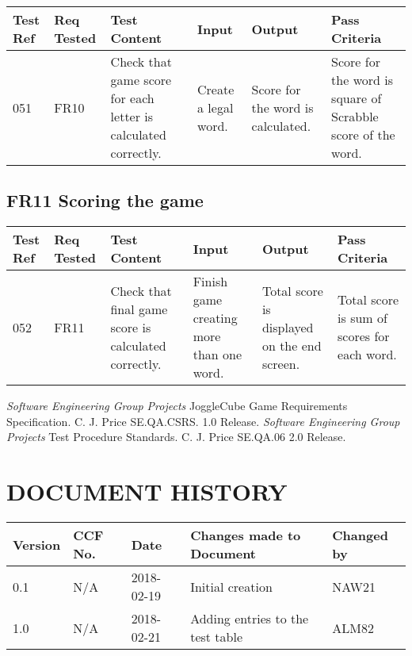 \documentclass{project}
\begin{document}
\begin{longtable}{|p{0.7cm}|p{1cm}|p{3.5cm}|p{3.2cm}|p{3.5cm}|p{3.5cm}|}
\hline
Test Ref & Req Tested & Test Content & Input  & Output & Pass Criteria \\ \hline \hline


051 & FR10 & Check that game score for each letter is calculated correctly. & Create a legal word. 
& Score for the word is calculated. & Score for the word is square of Scrabble score of the word. \\ \hline

\end{longtable}

\subsection{FR11  Scoring the game}

\begin{longtable}{|p{0.7cm}|p{1cm}|p{3.5cm}|p{3.2cm}|p{3.5cm}|p{3.5cm}|}
\hline
Test Ref & Req Tested & Test Content & Input  & Output & Pass Criteria \\ \hline \hline


052 & FR11 & Check that final game score is calculated correctly. & Finish game creating more than one word.
& Total score is displayed on the end screen. & Total score is sum of scores for each word. \\ \hline

\end{longtable}

\clearpage
{}
\begin{thebibliography}{5}
 \emph{Software Engineering Group Projects}
JoggleCube Game Requirements Specification.
C. J. Price SE.QA.CSRS. 1.0 Release.
 \emph{Software Engineering Group Projects}
Test Procedure Standards.
C. J. Price SE.QA.06 2.0 Release.
\end{thebibliography}
\clearpage
{}
\section*{DOCUMENT HISTORY}
\begin{tabular}{|l | l | l | l | l |}
\hline
Version & CCF No. & Date & Changes made to Document & Changed by \\
\hline
0.1 & N/A & 2018-02-19 & Initial creation & NAW21 \\
\hline
1.0 & N/A & 2018-02-21 & Adding entries to the test table & ALM82 \\
\hline
\end{tabular}
\label{thelastpage}
\end{document}
